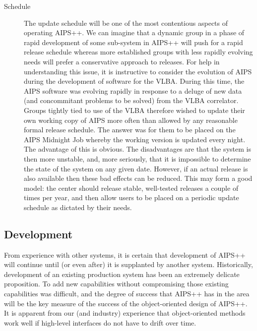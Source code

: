 \begin{description}
\item[Schedule] The update schedule will be one of the most contentious
aspects of operating AIPS++. We can imagine that a dynamic group in a
phase of rapid development of some sub-system in AIPS++ will push for
a rapid release schedule whereas more established groups with less
rapidly evolving needs will prefer a conservative approach to
releases. For help in understanding this issue, it is instructive to
consider the evolution of AIPS during the development of software for
the VLBA. During this time, the AIPS software was evolving rapidly in
response to a deluge of new data (and concommitant problems to be
solved) from the VLBA correlator. Groups tightly tied to use of the
VLBA therefore wished to update their own working copy of AIPS more
often than allowed by any reasonable formal release schedule. The
answer was for them to be placed on the AIPS Midnight Job whereby the
working version is updated every night. The advantage of this is
obvious. The disadvantages are that the system is then more unstable,
and, more seriously, that it is impossible to determine the state of
the system on any given date.  However, if an actual release is also
available then these bad effects can be reduced. This may form a good
model: the center should release stable, well-tested releases a couple
of times per year, and then allow users to be placed on a periodic
update schedule as dictated by their needs.

\end{description}

\subsection{Development}

From experience with other systems, it is certain that development of
AIPS++ will continue until (or even after) it is supplanted by another
system. Historically, development of an existing production system has
been an extremely delicate proposition. To add new capabilities
without compromising those existing capabilities was difficult, and
the degree of success that AIPS++ has in the area will be the key
measure of the success of the object-oriented design of AIPS++. It is
apparent from our (and industry) experience that object-oriented
methods work well if high-level interfaces do not have to drift over
time.

